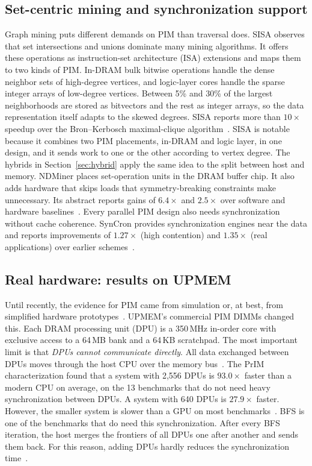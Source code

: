 \documentclass[journal,onecolumn]{IEEEtran}
\begin{document}
\subsection{Set-centric mining and synchronization support}
Graph mining puts different demands on PIM than traversal does. SISA observes that set intersections and unions dominate many mining algorithms. It offers these operations as instruction-set architecture (ISA) extensions and maps them to two kinds of PIM. In-DRAM bulk bitwise operations handle the dense neighbor sets of high-degree vertices, and logic-layer cores handle the sparse integer arrays of low-degree vertices. Between 5\% and 30\% of the largest neighborhoods are stored as bitvectors and the rest as integer arrays, so the data representation itself adapts to the skewed degrees. SISA reports more than $10\times$ speedup over the Bron--Kerbosch maximal-clique algorithm~\cite{besta2021sisa}. SISA is notable because it combines two PIM placements, in-DRAM and logic layer, in one design, and it sends work to one or the other according to vertex degree. The hybrids in Section~\ref{sec:hybrid} apply the same idea to the split between host and memory. NDMiner places set-operation units in the DRAM buffer chip. It also adds hardware that skips loads that symmetry-breaking constraints make unnecessary. Its abstract reports gains of $6.4\times$ and $2.5\times$ over software and hardware baselines~\cite{talati2022ndminer}. Every parallel PIM design also needs synchronization without cache coherence. SynCron provides synchronization engines near the data and reports improvements of $1.27\times$ (high contention) and $1.35\times$ (real applications) over earlier schemes~\cite{giannoula2021syncron}.

\subsection{Real hardware: results on UPMEM}
Until recently, the evidence for PIM came from simulation or, at best, from simplified hardware prototypes~\cite{gomezluna2022prim}. UPMEM's commercial PIM DIMMs changed this. Each DRAM processing unit (DPU) is a 350\,MHz in-order core with exclusive access to a 64\,MB bank and a 64\,KB scratchpad. The most important limit is that \emph{DPUs cannot communicate directly}. All data exchanged between DPUs moves through the host CPU over the memory bus~\cite{gomezluna2022prim}. The PrIM characterization found that a system with 2,556 DPUs is $93.0\times$ faster than a modern CPU on average, on the 13 benchmarks that do not need heavy synchronization between DPUs. A system with 640 DPUs is $27.9\times$ faster. However, the smaller system is slower than a GPU on most benchmarks~\cite{gomezluna2022prim}. BFS is one of the benchmarks that do need this synchronization. After every BFS iteration, the host merges the frontiers of all DPUs one after another and sends them back. For this reason, adding DPUs hardly reduces the synchronization time~\cite{gomezluna2022prim}.
\end{document}
